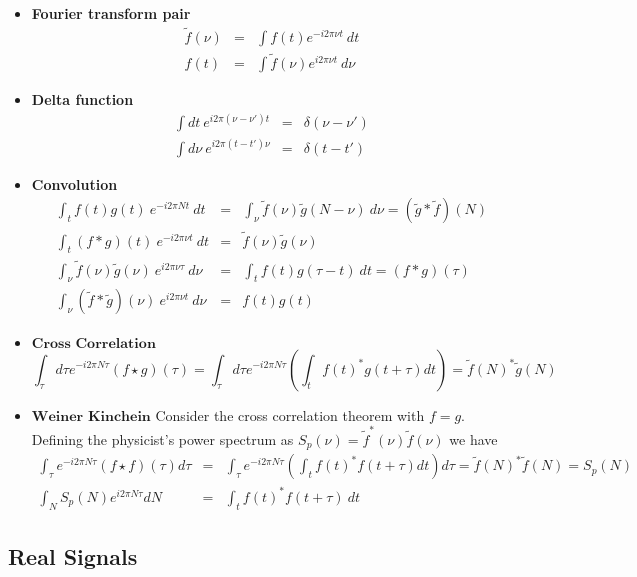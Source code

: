 \documentclass{article}
\begin{document}
\begin{itemize}
\item \textbf{Fourier transform pair} \begin{eqnarray*}
\tilde{f}(\nu) & = & \int f(t)e^{-i2\pi\nu t}~dt\\
f(t) & = & \int\tilde{f}(\nu)e^{i2\pi\nu t}~d\nu\end{eqnarray*}

\item \textbf{Delta function} \begin{eqnarray*}
\int dt\: e^{i2\pi(\nu-\nu')t} & = & \delta(\nu-\nu')\\
\int d\nu\: e^{i2\pi(t-t')\nu} & = & \delta(t-t')\end{eqnarray*}

\item \textbf{Convolution} \begin{eqnarray*}
\int_{t}f(t)g(t)~e^{-i2\pi Nt}~dt & = & \int_{\nu}\tilde{f}(\nu)\tilde{g}(N-\nu)~d\nu=(\tilde{g}*\tilde{f})(N)\\
\int_{t}(f*g)(t)~e^{-i2\pi\nu t}~dt & = & \tilde{f}(\nu)\tilde{g}(\nu)\\
\int_{\nu}\tilde{f}(\nu)\tilde{g}(\nu)~e^{i2\pi\nu\tau}~d\nu & = & \int_{t}f(t)g(\tau-t)~dt=(f*g)(\tau)\\
\int_{\nu}(\tilde{f}*\tilde{g})(\nu)~e^{i2\pi\nu t}~d\nu & = & f(t)g(t)\end{eqnarray*}

\item $\textbf{Cross Correlation}$\[
\int_{\tau}d\tau e^{-i2\pi N\tau}\left(f\star g\right)(\tau)=\int_{\tau}d\tau e^{-i2\pi N\tau}\left(\int_{t}f(t)^{*}g(t+\tau)dt\right)=\tilde{f}(N)^{*}\tilde{g}(N)\]

\item $\textbf{Weiner Kinchein}$ Consider the cross correlation theorem
with $f=g$. Defining the physicist's power spectrum as $S_{p}(\nu)=\tilde{f}^{*}(\nu)\tilde{f}(\nu)$
we have\begin{eqnarray*}
\int_{\tau}e^{-i2\pi N\tau}(f\star f)(\tau)d\tau & = & \int_{\tau}e^{-i2\pi N\tau}\left(\int_{t}f(t)^{*}f(t+\tau)dt\right)d\tau=\tilde{f}(N)^{*}\tilde{f}(N)=S_{p}(N)\\
\int_{N}S_{p}(N)e^{i2\pi N\tau}dN & = & \int_{t}f(t)^{*}f(t+\tau)\: dt\end{eqnarray*}
\end{itemize}

\subsection*{Real Signals}
\end{document}
